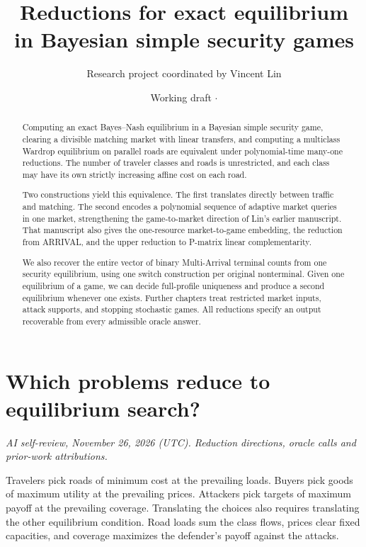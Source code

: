 \documentclass[11pt,oneside,openany,notitlepage]{report}
\title{Reductions for exact equilibrium\\in Bayesian simple security games}
\author{Research project coordinated by Vincent Lin}
\date{Working draft \(\cdot\) \reviewdate}
\newcommand{\reviewdate}{November 26, 2026 (UTC)}
\newcommand{\reviewmark}[1]{\par\nopagebreak[4]\noindent
  {\footnotesize\itshape AI self-review, \reviewdate. #1\par}\nobreak\smallskip}
\begin{document}
\maketitle

\begin{abstract}
Computing an exact Bayes--Nash equilibrium in a Bayesian simple security
game, clearing a divisible matching market with linear transfers, and
computing a multiclass Wardrop equilibrium on parallel roads are equivalent
under polynomial-time many-one reductions. The number of traveler classes
and roads is unrestricted, and each class may have its own strictly
increasing affine cost on each road.

Two constructions yield this equivalence. The first translates directly
between traffic and matching. The second encodes a polynomial sequence of
adaptive market queries in one market, strengthening the game-to-market
direction of Lin's earlier manuscript. That manuscript also gives the
one-resource market-to-game embedding, the reduction from ARRIVAL, and the
upper reduction to P-matrix linear complementarity.

We also recover the entire vector of binary Multi-Arrival terminal counts
from one security equilibrium, using one switch construction per original
nonterminal. Given one equilibrium of a game, we can decide full-profile
uniqueness and produce a second equilibrium whenever one exists. Further
chapters treat restricted market inputs, attack supports, and stopping
stochastic games. All reductions specify an output recoverable from every
admissible oracle answer.
\end{abstract}
\clearpage
{\small\tableofcontents}

\chapter{Which problems reduce to equilibrium search?}\label{sec:intro}
\reviewmark{Reduction directions, oracle calls and prior-work attributions.}

Travelers pick roads of minimum cost at the prevailing loads. Buyers pick
goods of maximum utility at the prevailing prices. Attackers pick targets
of maximum payoff at the prevailing coverage. Translating the choices
also requires translating the other equilibrium condition. Road loads
sum the class flows, prices clear fixed capacities, and coverage maximizes
the defender's payoff against the attacks.
\end{document}
